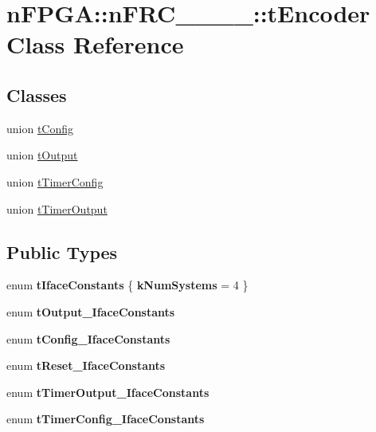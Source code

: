 \hypertarget{classnFPGA_1_1nFRC__2012__1__6__4_1_1tEncoder}{
\section{nFPGA::nFRC\_\_\_\_::tEncoder Class Reference}
\label{classnFPGA_1_1nFRC__2012__1__6__4_1_1tEncoder}
}
\subsection*{Classes}
\begin{DoxyCompactItemize}
\item 
union \hyperlink{unionnFPGA_1_1nFRC__2012__1__6__4_1_1tEncoder_1_1tConfig}{tConfig}
\item 
union \hyperlink{unionnFPGA_1_1nFRC__2012__1__6__4_1_1tEncoder_1_1tOutput}{tOutput}
\item 
union \hyperlink{unionnFPGA_1_1nFRC__2012__1__6__4_1_1tEncoder_1_1tTimerConfig}{tTimerConfig}
\item 
union \hyperlink{unionnFPGA_1_1nFRC__2012__1__6__4_1_1tEncoder_1_1tTimerOutput}{tTimerOutput}
\end{DoxyCompactItemize}
\subsection*{Public Types}
\begin{DoxyCompactItemize}
\item 
enum {\bfseries tIfaceConstants} \{ {\bfseries kNumSystems} =  4
 \}
\item 
enum {\bfseries tOutput\_\-IfaceConstants} 
\item 
enum {\bfseries tConfig\_\-IfaceConstants} 
\item 
enum {\bfseries tReset\_\-IfaceConstants} 
\item 
enum {\bfseries tTimerOutput\_\-IfaceConstants} 
\item 
enum {\bfseries tTimerConfig\_\-IfaceConstants} 
\end{DoxyCompactItemize}
